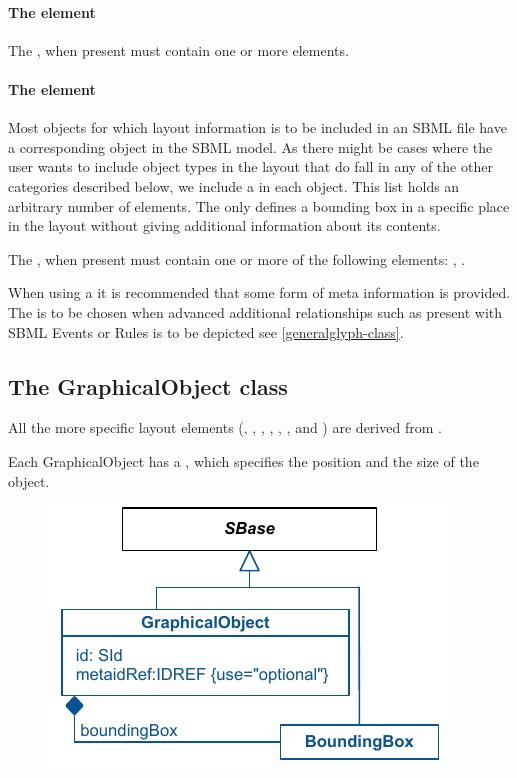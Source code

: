 \paragraph{The  element}
\label{listoftextglyphs-class}
The , when present must contain one or more 
\TextGlyph elements. 


\paragraph{The  element}
\label{listofadditionalgraphicalobjects-class}
Most objects for which layout information is to be included in an SBML 
file have a corresponding object in the SBML model. As there might be 
cases where the user wants to include object types in the layout that do 
fall in any of the other categories described below, we include a 
 in each \Layout object. This 
list holds an arbitrary number of  elements. The 
 only defines a bounding box in a specific place 
in the layout without giving additional information about its contents. 

The , when present must contain 
one or more of the following elements: \GraphicalObject, \GeneralGlyph. 

When using a \GraphicalObject it is recommended that some form of meta 
information is provided. The \GeneralGlyph is to be chosen when advanced 
additional relationships such as present with SBML Events or Rules is to 
be depicted see \ref{generalglyph-class}. 


\subsection{The GraphicalObject class} 
\label{graphicalobject-class}
All the more specific layout elements (\CompartmentGlyph, \GeneralGlyph, 
\SpeciesGlyph, \ReactionGlyph, \ReferenceGlyph, \TextGlyph, and 
\SpeciesReferenceGlyph) are derived from \GraphicalObject. 

Each GraphicalObject has a \BoundingBox, which specifies the position 
and the size of the object. 


\begin{figure}[!h]
\includegraphics{uml/layout-graphicalobject-uml}\\
\label{uml:graphicalobject}
\end{figure}


